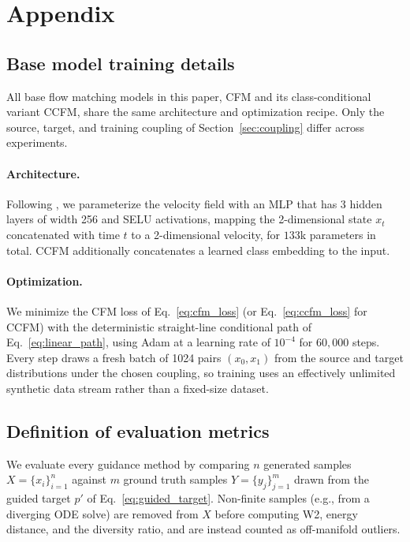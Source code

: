 \documentclass{article}
\begin{document}

\nocite{*}




\appendix

\section{Appendix}

\subsection{Base model training details}
\label{app:base_model}

All base flow matching models in this paper, CFM and its class-conditional variant CCFM, share the same architecture and optimization recipe. Only the source, target, and training coupling of Section~\ref{sec:coupling} differ across experiments.

\paragraph{Architecture.} Following \citet{feng25s_guidance}, we parameterize the velocity field with an MLP that has 3 hidden layers of width 256 and SELU activations, mapping the 2-dimensional state $x_t$ concatenated with time $t$ to a 2-dimensional velocity, for $133$k parameters in total. CCFM additionally concatenates a learned class embedding to the input.

\paragraph{Optimization.} We minimize the CFM loss of Eq.~\eqref{eq:cfm_loss} (or Eq.~\eqref{eq:ccfm_loss} for CCFM) with the deterministic straight-line conditional path of Eq.~\eqref{eq:linear_path}, using Adam \citep{kingma2015adam} at a learning rate of $10^{-4}$ for $60{,}000$ steps. Every step draws a fresh batch of 1024 pairs $(x_0,x_1)$ from the source and target distributions under the chosen coupling, so training uses an effectively unlimited synthetic data stream rather than a fixed-size dataset.

\subsection{Definition of evaluation metrics}
\label{app:metrics}

We evaluate every guidance method by comparing $n$ generated samples $X = \{x_i\}_{i=1}^n$ against $m$ ground truth samples $Y = \{y_j\}_{j=1}^m$ drawn from the guided target $p'$ of Eq.~\eqref{eq:guided_target}. Non-finite samples (e.g., from a diverging ODE solve) are removed from $X$ before computing W2, energy distance, and the diversity ratio, and are instead counted as off-manifold outliers.
\end{document}
